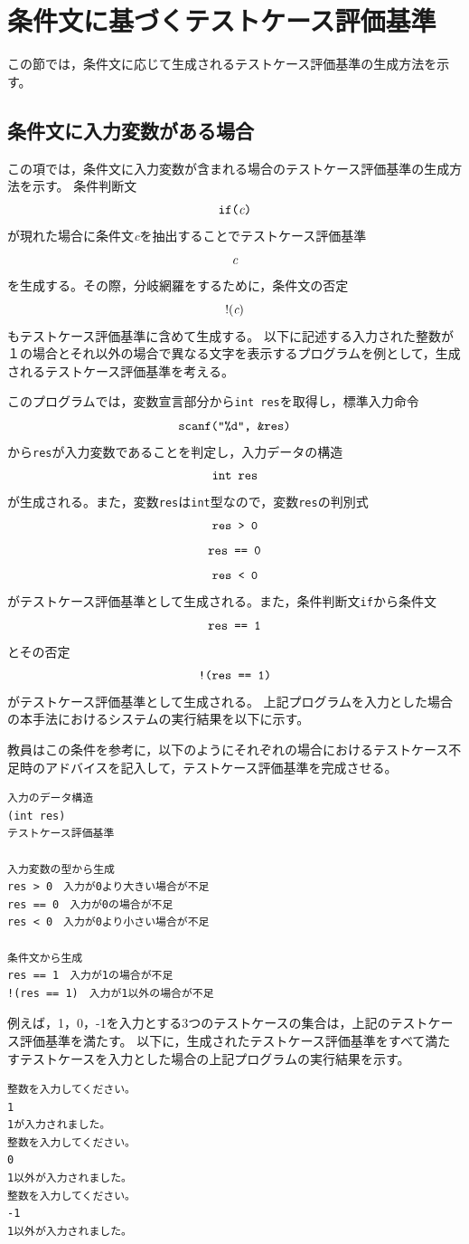 \documentclass{tpu-sotu}
\begin{document}
\section{条件文に基づくテストケース評価基準}
この節では，条件文に応じて生成されるテストケース評価基準の生成方法を示す。
\subsection{条件文に入力変数がある場合}
この項では，条件文に入力変数が含まれる場合のテストケース評価基準の生成方法を示す。
条件判断文\\
\[ 
\mbox{{\tt {if({\it c})}}}
\]
が現れた場合に条件文{\it c}を抽出することでテストケース評価基準
\[ 
\mbox{{\it c}}
\]
を生成する。その際，分岐網羅をするために，条件文の否定
\[ 
\mbox{!({\it c})}
\]
もテストケース評価基準に含めて生成する。
以下に記述する入力された整数が１の場合とそれ以外の場合で異なる文字を表示するプログラムを例として，生成されるテストケース評価基準を考える。

このプログラムでは，変数宣言部分から{\tt int res}を取得し，標準入力命令\\
\[ 
\mbox{{\tt {scanf("\%d", \&res)}}}
\]
から{\tt res}が入力変数であることを判定し，入力データの構造\\
\[
\mbox{{\tt  int res}}
\]
が生成される。また，変数{\tt res}は{\tt int}型なので，変数{\tt res}の判別式\\
\[ 
\mbox{\tt{res > 0}} 
\]
\[
\mbox{\tt{res == 0}}
\]
\[
\mbox{\tt{res < 0}}
\]
がテストケース評価基準として生成される。また，条件判断文{\tt if}から条件文\\
\[
\mbox{\tt{res == 1}}
\]
とその否定\\
\[
\mbox{\tt{!(res == 1)}}
\]
がテストケース評価基準として生成される。
上記プログラムを入力とした場合の本手法におけるシステムの実行結果を以下に示す。

教員はこの条件を参考に，以下のようにそれぞれの場合におけるテストケース不足時のアドバイスを記入して，テストケース評価基準を完成させる。
\begin{lstlisting}[xleftmargin=1cm]
入力のデータ構造
(int res)
テストケース評価基準

入力変数の型から生成
res > 0　入力が0より大きい場合が不足
res == 0　入力が0の場合が不足
res < 0　入力が0より小さい場合が不足

条件文から生成
res == 1　入力が1の場合が不足
!(res == 1)　入力が1以外の場合が不足
\end{lstlisting}
例えば，1，0，-1を入力とする3つのテストケースの集合は，上記のテストケース評価基準を満たす。
以下に，生成されたテストケース評価基準をすべて満たすテストケースを入力とした場合の上記プログラムの実行結果を示す。
\begin{lstlisting}[xleftmargin=1cm]
整数を入力してください。
1
1が入力されました。
整数を入力してください。
0
1以外が入力されました。
整数を入力してください。
-1
1以外が入力されました。
\end{lstlisting}
\end{document}
